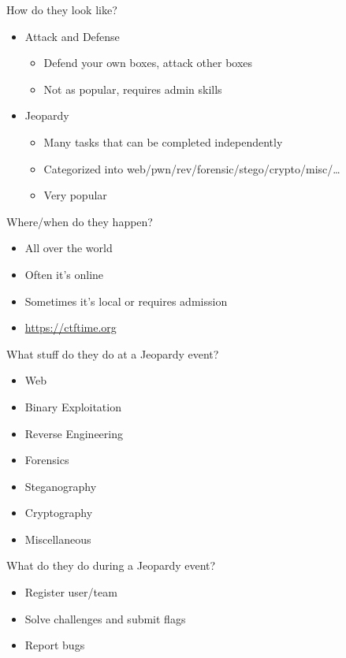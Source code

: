 \documentclass[presentation]{beamer}
\begin{document}
\begin{frame}[label={sec:org63f9548}]{How do they look like?}
\begin{itemize}
\item Attack and Defense
\begin{itemize}
\item Defend your own boxes, attack other boxes
\item Not as popular, requires admin skills
\end{itemize}
\item Jeopardy
\begin{itemize}
\item Many tasks that can be completed independently
\item Categorized into web/pwn/rev/forensic/stego/crypto/misc/\ldots{}
\item Very popular
\end{itemize}
\end{itemize}
\end{frame}

\begin{frame}[label={sec:orge620af6}]{Where/when do they happen?}
\begin{itemize}
\item All over the world
\item Often it's online
\item Sometimes it's local or requires admission
\item \url{https://ctftime.org}
\end{itemize}
\end{frame}

\begin{frame}[label={sec:org5eed9e9}]{What stuff do they do at a Jeopardy event?}
\begin{itemize}
\item Web
\item Binary Exploitation
\item Reverse Engineering
\item Forensics
\item Steganography
\item Cryptography
\item Miscellaneous
\end{itemize}
\end{frame}

\begin{frame}[label={sec:org5185dbc}]{What do they do during a Jeopardy event?}
\begin{itemize}
\item Register user/team
\item Solve challenges and submit flags
\item Report bugs
\end{itemize}
\end{frame}
\end{document}
